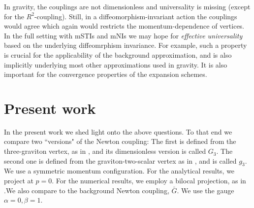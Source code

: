 \documentclass[11pt]{book} %
\begin{document}
In gravity, the couplings are not dimensionless and universality is
missing (except for the $R^2$-coupling). Still, in a
diffeomorphism-invariant action the couplings would agree which again
would restricts the momentum-dependence of vertices. In the full
setting with mSTIs and mNIs we may hope for {\it effective
  universality} based on the underlying diffeomrphism invariance. For
example, such a property is crucial for the applicability of the
background approximation, and is also implicitly underlying most other
approximations used in gravity. It is also important for the
convergence properties of the expansion schemes.


\section{Present work}

In the present work we shed light onto the above questions. To that end
we compare two ``versions" of the Newton coupling: The first is
defined from the three-graviton vertex, as in
\cite{Christiansen:2015rva,Meibohm:2015twa}, and its dimensionless
version is called $G_3$. The second one is defined from the
graviton-two-scalar vertex as in \cite{Dona:2015tnf}, and is called
$g_3$. We use a symmetric momentum configuration. For the analytical
results, we project at $p=0$. For the numerical results, we employ a
bilocal projection, as in
\cite{Christiansen:2015rva,Meibohm:2015twa}.\newline We also compare
to the background Newton coupling, $\bar{G}$. We use the gauge
$\alpha=0, \beta=1$.
\end{document}
